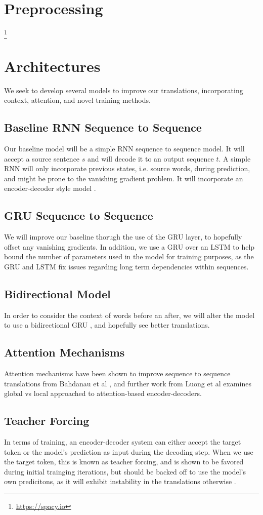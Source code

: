 \documentclass[twoside,twocolumn]{article}
\begin{document}
\section{Preprocessing}
\footnote{\url{https://spacy.io}}
\section{Architectures}
We seek to develop several models to improve our translations, incorporating context, attention, and novel training methods.

\subsection{Baseline RNN Sequence to Sequence}
Our baseline model will be a simple RNN sequence to sequence model. It will accept a source sentence $s$ and will decode it to an output sequence $t$. A simple RNN will only incorporate previous states, i.e. source words, during prediction, and might be prone to the vanishing gradient problem. It will incorporate an encoder-decoder style model \cite{cho2014learning} \cite{sutskever2014sequence}.
\subsection{GRU Sequence to Sequence}
We will improve our baseline thorugh the use of the GRU layer, to hopefully offset any vanishing gradients. In addition, we use a GRU over an LSTM to help bound the number of parameters used in the model for training purposes, as the GRU and LSTM fix issues regarding long term dependencies within sequences.
\subsection{Bidirectional Model}
In order to consider the context of words before an after, we will alter the model to use a bidirectional GRU \cite{bahdanau2014neural}, and hopefully see better translations.
\subsection{Attention Mechanisms}
Attention mechanisms have been shown to improve sequence to sequence translations from Bahdanau et al \cite{bahdanau2014neural}, and further work from Luong et al \cite{luong2015effective} examines global vs local approached to attention-based encoder-decoders.
\subsection{Teacher Forcing}
In terms of training, an encoder-decoder system can either accept the target token or the model's prediction as input during the decoding step. When we use the target token, this is known as teacher forcing, and is shown to be favored during initial trainging iterations, but should be backed off to use the model's own predicitons, as it will exhibit instability in the translations otherwise \cite{lamb2016professor}.
\end{document}
